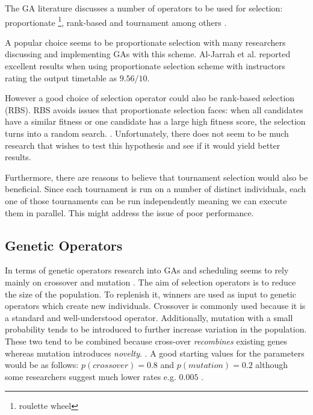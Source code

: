 \documentclass[a4paper, 12pt, titlepage]{article}
\begin{document}
The GA literature discusses a number of operators to be used for
selection: proportionate \footnote{roulette wheel}, rank-based and
tournament among others \cite{floreano2008, eberhart2007, heaton2014}.

A popular choice seems to be proportionate selection with
many researchers discussing and implementing GAs with this
scheme. \cite{timilsina2015, yu2002, aljarrah2017, mesghouni2004}
Al-Jarrah et al. reported excellent results when using proportionate
selection scheme with instructors rating the output timetable as \(9.56/10\).

However a good choice of selection operator could also be rank-based
selection (RBS).  RBS avoids issues that proportionate selection faces:
when all candidates have a similar fitness or one candidate has a
large high fitness score, the selection turns into a random search.
\cite[p.~23]{floreano2008}. Unfortunately, there does not seem to be
much research that wishes to test this hypothesis and see if it would
yield better results.

Furthermore, there are reasons to believe that tournament selection would
also be beneficial.  Since each tournament is run on a number of distinct
individuals, each one of those tournaments can be run independently
meaning we can execute them in parallel. This might address the issue
of poor performance. 

\subsection*{Genetic Operators}

In terms of genetic operators research into GAs and scheduling seems
to rely mainly on crossover and mutation \cite{yu2002, aljarrah2017,
mesghouni2004, hosseinabadi2018, solanki2015, timilsina2015, may2015}.
The aim of selection operators is to reduce the size of the population. To
replenish it, winners are used as input to genetic operators which create
new individuals.  Crossover is commonly used because it is a standard and
well-understood operator. Additionally, mutation with a small probability
tends to be introduced to further increase variation in the population.
These two tend to be combined because cross-over \emph{recombines}
existing genes whereas mutation introduces \emph{novelty}.
\cite[p.~27]{heaton2014}.  A good starting values for the parameters would
be as follows: \(p(crossover) = 0.8\) \cite[p.~117]{eberhart2007} and
\(p(mutation) = 0.2\) \cite[p.~25]{heaton2014} although some researchers
suggest much lower rates e.g. \(0.005\) \cite[p.~117]{eberhart2007}.
\end{document}
